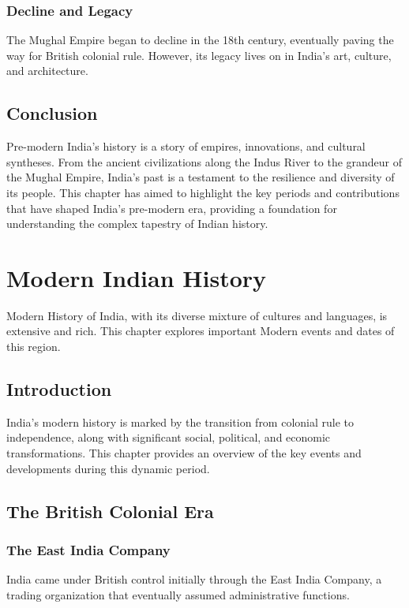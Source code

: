 \documentclass[a4paper,12pt]{book}
\begin{document}
\subsection{Decline and Legacy}
The Mughal Empire began to decline in the 18th century, eventually paving the way for British colonial rule. However, its legacy lives on in India’s art, culture, and architecture.

\section{Conclusion}
\label{sec:conclusion-pre-modern-india}
Pre-modern India’s history is a story of empires, innovations, and cultural syntheses. From the ancient civilizations along the Indus River to the grandeur of the Mughal Empire, India’s past is a testament to the resilience and diversity of its people. This chapter has aimed to highlight the key periods and contributions that have shaped India’s pre-modern era, providing a foundation for understanding the complex tapestry of Indian history.

\chapter{Modern Indian History}
\label{ch:modern-indian-history}

Modern History of India, with its diverse mixture of cultures and languages, is extensive and rich. This chapter explores important Modern events and dates of this region.

\section{Introduction}
\label{sec:introduction-modern-india}
India’s modern history is marked by the transition from colonial rule to independence, along with significant social, political, and economic transformations. This chapter provides an overview of the key events and developments during this dynamic period.

\section{The British Colonial Era}
\label{sec:british-colonial-era}

\subsection{The East India Company}
India came under British control initially through the East India Company, a trading organization that eventually assumed administrative functions.
\end{document}
